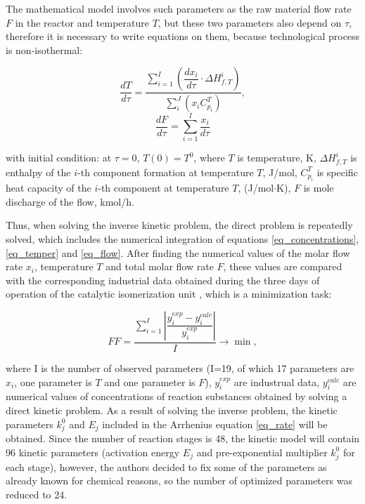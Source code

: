 \documentclass[mathematics,article,submit,pdftex,moreauthors]{Definitions/mdpi}
\begin{document}
The mathematical model involves such parameters as the raw material flow rate $F$ in the reactor and temperature $T$, but these two parameters also depend on $\tau$, therefore it is necessary to write equations on them, because technological process is non-isothermal:
\begin{linenomath}
\begin{equation}\label{eq_temper}
\dfrac{dT}{d\tau} = \dfrac{\sum_{i=1}^I\left( \dfrac{dx_i}{d\tau} \cdot \Delta H^i_{f,T} \right) }{\sum_i^J \left(x_i C^T_{p_i} \right) },
\end{equation}
\begin{equation}\label{eq_flow}
\dfrac{dF}{d\tau} = \sum_{i=1}^I  \dfrac{x_i}{d\tau}
\end{equation}
\end{linenomath}
with initial condition: at $\tau = 0$, $T(0) = T^0$, where $T$ is temperature, K, $\Delta H^i_{f,T}$ is enthalpy of the $i$-th component formation at temperature $T$, J/mol, $C^T_{p_i}$ is specific heat capacity of the $i$-th component at temperature $T$, (J/mol$\cdot$K), $F$ is mole discharge of the flow, kmol/h.

Thus, when solving the inverse kinetic problem, the direct problem is repeatedly solved, which includes the numerical integration of equations \eqref{eq_concentrations}, \eqref{eq_temper} and \eqref{eq_flow}. After finding the numerical values of the molar flow rate $x_i$, temperature $T$ and total molar flow rate $F$, these values are compared with the corresponding industrial data obtained during the three days of operation of the catalytic isomerization unit \cite{enik2021}, which is a minimization task:

\begin{linenomath}
\begin{equation}\label{FF}
FF = \dfrac{\sum_{i=1}^I \left| \dfrac{y_i^{exp} - y_i^{calc}}{y_i^{exp}} \right|}{I} \rightarrow \min,
\end{equation}
\end{linenomath}
where I is the number of observed parameters (I=19, of which 17 parameters are $x_i$, one parameter is $T$ and one parameter is $F$),  $y_{i}^{exp}$ are industrual data, $y_{i}^{calc}$ are numerical values of concentrations of reaction substances obtained by solving a direct kinetic problem. As a result of solving the inverse problem, the kinetic parameters $k^0_j$ and $E_j$ included in the Arrhenius equation \eqref{eq_rate} will be obtained. Since the number of reaction stages is 48, the kinetic model will contain 96 kinetic parameters (activation energy $E_j$ and pre-exponential multiplier $k^0_j$ for each stage), however, the authors decided to fix some of the parameters as already known for chemical reasons, so the number of optimized parameters was reduced to 24.
\end{document}
